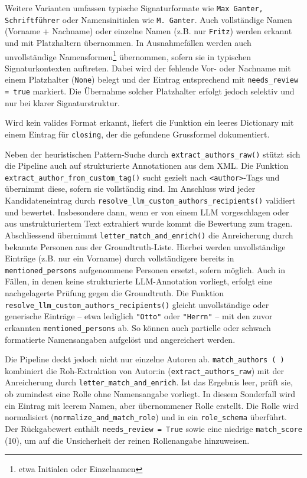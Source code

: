 \documentclass[12pt, a4paper, ngerman, bidi=default]{article}
\newcommand{\code}[1]{\colorbox{VeryLightGray}{\texttt{#1}}} %
\begin{document}
Weitere Varianten umfassen typische Signaturformate wie \texttt{Max Ganter, Schriftführer} oder Namensinitialen wie \texttt{M. Ganter}.
Auch vollständige Namen (Vorname + Nachname) oder einzelne Namen (z.B. nur \texttt{Fritz}) werden erkannt und mit Platzhaltern übernommen. In Ausnahmefällen werden auch unvollständige Namensformen\footnote{etwa Initialen oder Einzelnamen} übernommen, sofern sie in typischen Signaturkontexten auftreten. Dabei wird der fehlende Vor- oder Nachname mit einem Platzhalter (\code{None}) belegt und der Eintrag entsprechend mit \code{needs\_review = true} markiert. Die Übernahme solcher Platzhalter erfolgt jedoch selektiv und nur bei klarer Signaturstruktur.

Wird kein valides Format erkannt, liefert die Funktion ein leeres Dictionary mit einem Eintrag für \code{closing}, der die gefundene Grussformel dokumentiert.

Neben der heuristischen Pattern-Suche durch \code{extract\_authors\_raw()} stützt sich die Pipeline auch auf strukturierte Annotationen aus dem XML. Die Funktion \code{extract\_author\_from\_custom\_tag()} sucht gezielt nach \code{<author>}-Tags und übernimmt diese, sofern sie vollständig sind. Im Anschluss wird jeder Kandidateneintrag durch \code{resolve\_llm\_custom\_authors\_recipients()} validiert und bewertet. Insbesondere dann, wenn er von einem LLM vorgeschlagen oder aus unstrukturiertem Text extrahiert wurde kommt die Bewertung zum tragen. Abschliessend übernimmt \code{letter\_match\_and\_enrich()} die Anreicherung durch bekannte Personen aus der Groundtruth-Liste. Hierbei werden unvollständige Einträge (z.B. nur ein Vorname) durch vollständigere bereits in \code{mentioned\_persons} aufgenommene Personen ersetzt, sofern möglich. Auch in Fällen, in denen keine strukturierte LLM-Annotation vorliegt, erfolgt eine nachgelagerte Prüfung gegen die Groundtruth. Die Funktion \code{resolve\_llm\_custom\_authors\_recipients()} gleicht unvollständige oder generische Einträge – etwa lediglich \texttt{"Otto"} oder \texttt{"Herrn"} – mit den zuvor erkannten \code{mentioned\_persons} ab. So können auch partielle oder schwach formatierte Namensangaben aufgelöst und angereichert werden.

Die Pipeline deckt jedoch nicht nur einzelne Autoren ab. \code{match\_authors~(~)} kombiniert die Roh-Extraktion von Autor:in (\code{extract\_authors\_raw}) mit der Anreicherung durch \code{letter\_match\_and\_enrich}. Ist das Ergebnis leer, prüft sie, ob zumindest eine Rolle ohne Namensangabe vorliegt. In diesem Sonderfall wird ein Eintrag mit leerem Namen, aber übernommener Rolle erstellt. Die Rolle wird normalisiert (\code{normalize\_and\_match\_role}) und in ein \code{role\_schema} überführt. Der Rückgabewert enthält \code{needs\_review = True} sowie eine niedrige \code{match\_score} (10), um auf die Unsicherheit der reinen Rollenangabe hinzuweisen.
\end{document}
